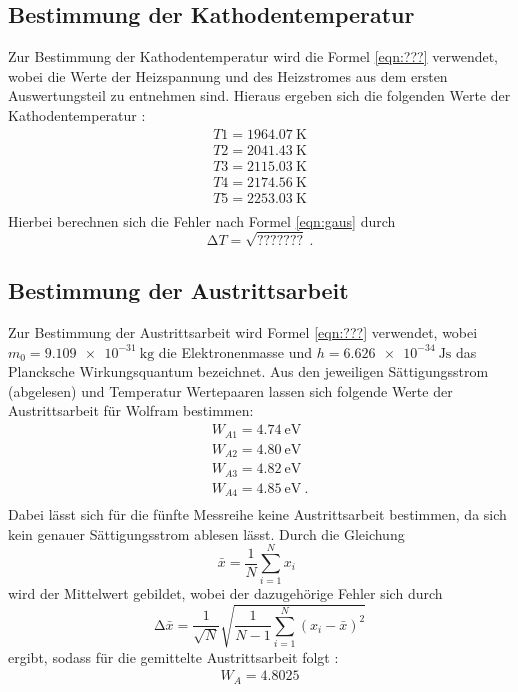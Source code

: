 \subsection{Bestimmung der Kathodentemperatur}
Zur Bestimmung der Kathodentemperatur wird die Formel \ref{eqn:???} verwendet, wobei
die Werte der Heizspannung und des Heizstromes aus dem ersten Auswertungsteil zu
entnehmen sind. Hieraus ergeben sich die folgenden Werte der Kathodentemperatur :
\begin{align*}
  T1= \SI{1964.07}{\kelvin} \\
  T2= \SI{2041.43}{\kelvin} \\
  T3= \SI{2115.03}{\kelvin} \\
  T4= \SI{2174.56}{\kelvin} \\
  T5= \SI{2253.03}{\kelvin} \\
\end{align*}
Hierbei berechnen sich die Fehler nach Formel \ref{eqn:gaus} durch
\begin{equation}
  \increment T = \sqrt{???????} \: .
\end{equation}
\subsection{Bestimmung der Austrittsarbeit}
Zur Bestimmung der Austrittsarbeit wird Formel \ref{eqn:???} verwendet, wobei
$m_0 = \SI{9.109e-31}{\kilo\gram} $\cite{q3} die Elektronenmasse und $h= \SI{6.626e-34}{\joule\second}$ \cite{q4}
das Plancksche Wirkungsquantum bezeichnet.
Aus den jeweiligen Sättigungsstrom (abgelesen) und Temperatur Wertepaaren lassen sich
folgende Werte der Austrittsarbeit für Wolfram bestimmen:
\begin{align*}
  W_{A1}= \SI{4.74}{\electronvolt} \\
  W_{A2}= \SI{4.80}{\electronvolt} \\
  W_{A3}= \SI{4.82}{\electronvolt} \\
  W_{A4}= \SI{4.85}{\electronvolt} \: .\\
\end{align*}
Dabei lässt sich für die fünfte Messreihe keine Austrittsarbeit bestimmen, da sich
kein genauer Sättigungsstrom ablesen lässt.
Durch die Gleichung
\begin{equation}
  \bar{x} = \frac{1}{N} \sum_{i=1}^{N} x_i \: \:
  \label{eqn:mit}
\end{equation}
\noindent wird der Mittelwert gebildet, wobei der dazugehörige Fehler sich durch
\begin{equation}
  \increment \bar{x} = \frac{1}{\sqrt{N}} \sqrt{ \frac{1}{N-1} \sum_{i=1}^N
  (x_i - \bar{x})^2}
  \label{eqn:mitf}
\end{equation}
ergibt, sodass für die gemittelte Austrittsarbeit folgt :
\begin{align*}
  W_A = \SI{4.8025}
\end{align*}
